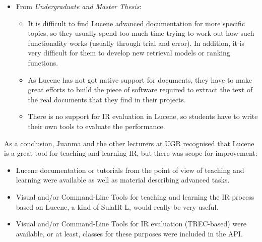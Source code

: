 \begin{itemize}
\item From {\it Undergraduate and Master Thesis}:

	\begin{itemize}
		\item It is difficult to find Lucene advanced documentation for more specific topics, so they usually spend too much time trying to work out how such functionality works (usually through trial and error). In addition,  it is very difficult for them to develop new retrieval models or ranking functions.
		\item As Lucene has not got native support for documents, they have to make great efforts to build the piece of software required to extract the text of the real documents that they find in their projects.
		\item There is no support for IR evaluation in Lucene, so students have to write their own tools to evaluate the performance.
	\end{itemize}

\end{itemize}

As a conclusion, Juanma and the other lecturers at UGR recognised that Lucene is a great tool for teaching and learning IR, but there was scope for improvement:

\begin{itemize}
\item Lucene documentation or tutorials from the point of view of teaching and learning were available as well as material describing advanced tasks.
\item Visual and/or Command-Line Tools for teaching and learning the IR process based on Lucene, a kind of SulaIR-L, would really be very useful.
\item Visual and/or Command-Line Tools for IR evaluation (TREC-based) were available, or at least, classes for these purposes were included in the API.
\end{itemize}